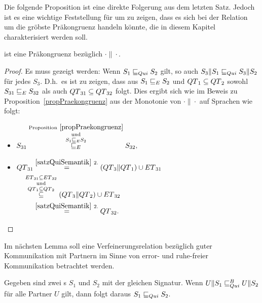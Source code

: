 Die folgende Proposition ist eine direkte Folgerung aus dem letzten Satz.
Jedoch ist es eine wichtige Feststellung für um zu zeigen, dass es sich bei der
Relation \QRel{} um die gröbste Präkongruenz handeln könnte, die in diesem
Kapitel charakterisiert werden soll.

\begin{prop}
  \label{propQuiPrae}
  \QRel{} ist eine Präkongruenz bezüglich $\cdot\|\cdot$.
\end{prop}

\begin{proof}
  Es muss gezeigt werden: Wenn $S_1\sqsubseteq _{Qui} S_2$ gilt, so auch
  $S_3\|S_1\sqsubseteq _{Qui} S_3\|S_2$ für jedes $S_3$. D.h.\ es ist zu zeigen, dass aus
  $S_1\sqsubseteq _E S_2$ und $QT{}_1\subseteq QT{}_2$ sowohl $S_{31}\sqsubseteq _E S_{32}$ als
  auch $QT{}_{31}\subseteq QT{}_{32}$ folgt. Dies ergibt sich wie im Beweis
  zu Proposition~\ref{propPraekongruenz} aus der Monotonie von $\cdot\|\cdot$
  auf Sprachen wie folgt:
  \begin{itemize}
    \item $\begin{aligned}[t]
        S_{31} \overset{\mathrm{Proposition}
        ~\ref{propPraekongruenz}}{\overset{\mathrm{und}}{\overset{S_1\sqsubseteq _E
    S_2}{\sqsubseteq _E}}} S_{32},
    \end{aligned}$
    \item $\begin{aligned}[t]
        \QT{}_{31} &\overset{\ref{satzQuiSemantik}~2.}{=}
        (\QT{}_3\|\QT{}_1)\cup \ET{}_{31}\\
        &\hspace{-0.5cm}\overset{\ET{}_{31}\subseteq
      \ET{}_{32}}{\overset{\mathrm{und}}{\overset{\QT{}_1\subseteq
      \QT{}_2}{\subseteq}}} (\QT{}_3\|\QT{}_2) \cup \ET{}_{32}\\
        &\overset{\ref{satzQuiSemantik}~2.}{=} \QT{}_{32}.
    \end{aligned}$
  \end{itemize}
\end{proof}

Im nächsten Lemma soll eine Verfeinerungsrelation bezüglich guter Kommunikation
mit Partnern im Sinne von error- und ruhe-freier Kommunikation betrachtet
werden.

\begin{lem}
  \label{lemQuiVerfeinerung}
  Gegeben sind zwei \EIO{}s $S_1$ und $S_2$ mit der gleichen Signatur. Wenn
  $U\|S_1\sqsubseteq _{Qui}^B U\|S_2$ für alle Partner $U$ gilt, dann folgt daraus $S_1\sqsubseteq _{Qui}
  S_2$.
\end{lem}

